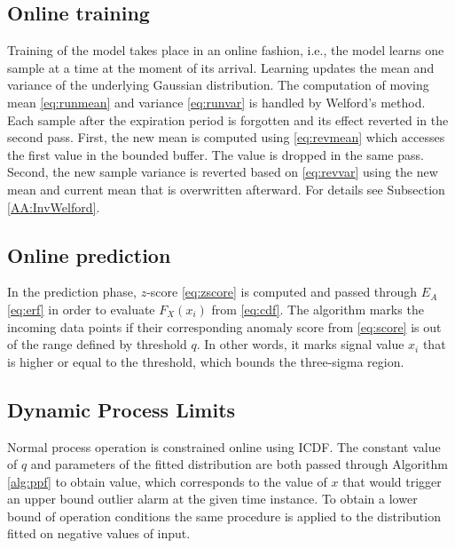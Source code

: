 \subsection{Online training}\label{train}
Training of the model takes place in an online fashion, i.e., the model learns one sample at a time at the moment of its arrival. Learning updates the mean and variance of the underlying Gaussian distribution. The computation of moving mean \eqref{eq:runmean} and variance \eqref{eq:runvar} is handled by Welford's method. Each sample after the expiration period is forgotten and its effect reverted in the second pass. First, the new mean is computed using \eqref{eq:revmean} which accesses the first value in the bounded buffer. The value is dropped in the same pass. Second, the new sample variance is reverted based on \eqref{eq:revvar} using the new mean and current mean that is overwritten afterward. For details see Subsection \ref{AA:InvWelford}.

\subsection{Online prediction}\label{predict}
In the prediction phase, \(z\)-score \eqref{eq:zscore} is computed and passed through $E_A$ \eqref{eq:erf} in order to evaluate $F_{X}(x_i)$ from \eqref{eq:cdf}. The algorithm marks the incoming data points if their corresponding anomaly score from \eqref{eq:score} is out of the range defined by threshold \(q\). In other words, it marks signal value \(x_i\) that is higher or equal to the threshold, which bounds the three-sigma region.

\subsection{Dynamic Process Limits}\label{constrait}
Normal process operation is constrained online using ICDF. The constant value of \(q\) and parameters of the fitted distribution are both passed through Algorithm \ref{alg:ppf} to obtain value, which corresponds to the value of \(x\) that would trigger an upper bound outlier alarm at the given time instance. To obtain a lower bound of operation conditions the same procedure is applied to the distribution fitted on negative values of input.


